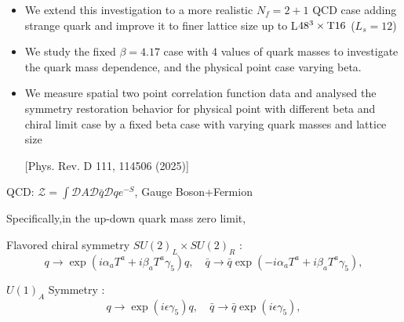 \documentclass[10pt, aspectratio=169]{beamer} %
\begin{document}
\begin{frame}
\vfill
{}
\fontsize{11pt}{14pt}\selectfont
\begin{itemize}
\item  We extend this investigation to a more realistic $N_f=2+1$ QCD case adding strange quark and  improve it to finer lattice size up to L$48^3\times \rm T16$ ($L_s = 12$)
\item  We study the fixed $\beta = 4.17$ case  with 4 values of quark masses to
investigate the quark mass dependence, and the physical point case
varying beta.
\item  We measure spatial two point correlation function data and analysed the symmetry restoration behavior for physical point with different beta and chiral limit case by a fixed beta case with varying quark masses and lattice size

 {\scriptsize [Phys. Rev. D 111, 114506 (2025)]} \end{itemize}
\vfill
\end{frame}
\begin{frame}
\vfill
QCD: \hfill
 $\mathcal{Z} =
\int \mathcal{D} A \mathcal{D}\bar{q} \mathcal{D}qe^{-
S}$, Gauge Boson+Fermion\hfill\null

\vspace{1em}

Specifically,in the up-down quark mass zero limit,

Flavored chiral symmetry $SU(2)_L \times SU(2)_R$ :
\[
    q \to \exp(i\alpha_a T^a + i\beta_a T^a \gamma_5)q, \quad \bar{q} \to \bar{q} \exp(-i\alpha_a T^a + i\beta_a T^a \gamma_5),
\]

$U(1)_A$ Symmetry :
\[
    q \to \exp(i\epsilon\gamma_5)q, \quad \bar{q} \to \bar{q} \exp(i\epsilon\gamma_5),
\]

\vfill
\end{frame}
\end{document}
